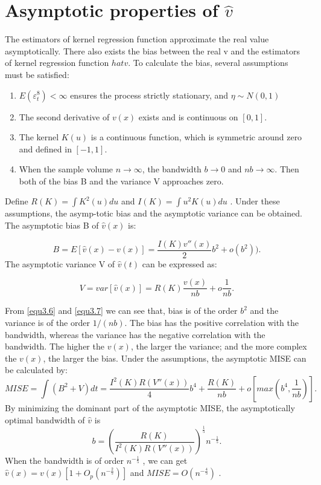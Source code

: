 \section{ Asymptotic properties of $\hat{v}$}
The estimators of kernel regression function approximate the real value asymptotically. There also exists the bias between the real v and the estimators of kernel regression function $hat{v}$.
To calculate the bias, several assumptions must be satisfied:
 \begin{enumerate}
    \item $E(\varepsilon_{t}^{8})<\infty$ ensures the process strictly stationary, and $\eta \sim N(0,1)$\cite{Ling2002}
    \item The second derivative of $v(x)$ exists and is continuous on $[0,1]$.
    \item The kernel $K(u)$ is a continuous function, which is symmetric around zero and defined in $[-1, 1]$.
    
    \item When the sample volume $n \rightarrow \infty $, the bandwidth $b \rightarrow 0 $ and $nb \rightarrow \infty $. Then both of the bias B and the variance V approaches zero.
  
\end{enumerate}
Define $R(K)= \int K^{2}(u)du$ and $I(K)=\int u^{2}K(u)du$ . Under these assumptions, the asymp-totic bias and the asymptotic variance can be obtained.
The asymptotic bias B of $\hat{v}(x)$ is:

\begin{equation}
\label{equ3.6}
B=E[\hat{v}(x)-v(x)] = \frac{I(K)v''(x)}{2}b^{2}+o(b^{2})).
\end{equation}
The asymptotic variance V of $\hat{v}(t)$ can be expressed as:

\begin{equation}
\label{equ3.7}
V=var[\hat{v}(x)]=R(K)\frac{v(x)}{nb}+o\frac{1}{nb}.
\end{equation}   

From \ref{equ3.6} and \ref{equ3.7} we can see that, bias is of the order $b^{2}$ and the variance is of the order $1/(nb)$. The bias has the positive correlation with the bandwidth, whereas the variance has the negative correlation with the bandwidth. The higher the $v(x)$, the larger the variance; and the more complex the $v(x)$, the larger the bias.
Under the assumptions, the asymptotic MISE can be calculated by:
\begin{equation}
MISE = \int(B^{2}+V)dt=\frac{I^{2}(K)R(V''(x))}{4}b^{4} + \frac{R(K)}{nb} + o[max(b^{4},\frac{1}{nb})].
\end{equation}
By minimizing the dominant part of the asymptotic MISE, the asymptotically optimal bandwidth of $\hat{v}$  is
\begin{equation}
b=(\frac{R(K)}{I^{2}(K)R(V''(x))})^{\frac{1}{5}}n^{-\frac{1}{5}}.
\end{equation}
When the bandwidth is of order $n^{-\frac{1}{5}}$  , we can get $\hat{v}(x)=v(x)[1+O_{p}(n^{-\frac{2}{5}})]$  and $MISE=O(n^{-\frac{4}{5}})$ \cite{Gasser1984} \cite{Fan1991}.

